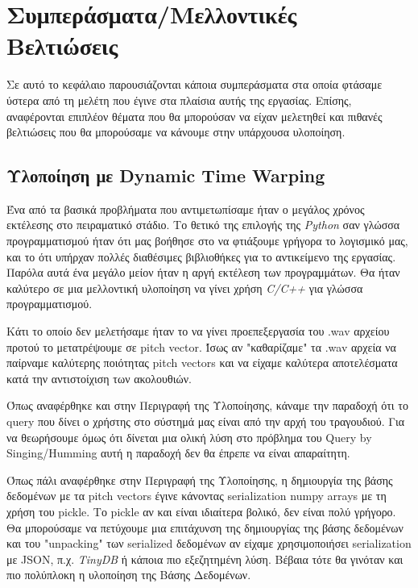 \section{Συμπεράσματα/Μελλοντικές Βελτιώσεις}
Σε αυτό το κεφάλαιο παρουσιάζονται κάποια συμπεράσματα στα οποία φτάσαμε ύστερα από τη μελέτη που έγινε στα πλαίσια αυτής της εργασίας. Επίσης, αναφέρονται επιπλέον θέματα που θα μπορούσαν να είχαν μελετηθεί 
και πιθανές βελτιώσεις που θα μπορούσαμε να κάνουμε στην υπάρχουσα υλοποίηση.

\subsection{Υλοποίηση με Dynamic Time Warping}
Ένα από τα βασικά προβλήματα που αντιμετωπίσαμε ήταν ο μεγάλος χρόνος εκτέλεσης στο πειραματικό στάδιο. Το θετικό της επιλογής της \textit{Python} \cite{python} σαν γλώσσα προγραμματισμού ήταν ότι μας βοήθησε στο να φτιάξουμε γρήγορα το λογισμικό μας, και το ότι υπήρχαν πολλές διαθέσιμες βιβλιοθήκες για το αντικείμενο της εργασίας. Παρόλα αυτά ένα μεγάλο μείον ήταν η αργή εκτέλεση των προγραμμάτων. Θα ήταν καλύτερο σε μια μελλοντική υλοποίηση να γίνει χρήση \textit{C/C++} για γλώσσα προγραμματισμού.
  
Κάτι το οποίο δεν μελετήσαμε ήταν το να γίνει προεπεξεργασία του .wav αρχείου προτού το μετατρέψουμε σε pitch vector. Ίσως αν "καθαρίζαμε" τα .wav αρχεία να παίρναμε καλύτερης ποιότητας pitch vectors και να είχαμε καλύτερα αποτελέσματα κατά την αντιστοίχιση των ακολουθιών. 

Όπως αναφέρθηκε και στην Περιγραφή της Υλοποίησης, κάναμε την παραδοχή ότι το query που δίνει ο χρήστης στο σύστημά μας είναι από την αρχή του τραγουδιού. Για να θεωρήσουμε όμως ότι δίνεται μια ολική λύση στο πρόβλημα του Query by Singing/Humming αυτή η παραδοχή δεν θα έπρεπε να είναι απαραίτητη.

Όπως πάλι αναφέρθηκε στην Περιγραφή της Υλοποίησης, η δημιουργία της βάσης δεδομένων με τα pitch vectors έγινε κάνοντας serialization numpy arrays με τη χρήση του pickle. Το pickle αν και είναι ιδιαίτερα βολικό, δεν είναι πολύ γρήγορο. Θα μπορούσαμε να πετύχουμε μια επιτάχυνση της δημιουργίας της βάσης δεδομένων και του "unpacking" των serialized δεδομένων αν είχαμε χρησιμοποιήσει serialization με JSON, π.χ. \textit{TinyDB} \cite{tinydb} ή κάποια πιο εξεζητημένη λύση. Βέβαια τότε θα γινόταν και πιο πολύπλοκη η υλοποίηση της Βάσης Δεδομένων.

